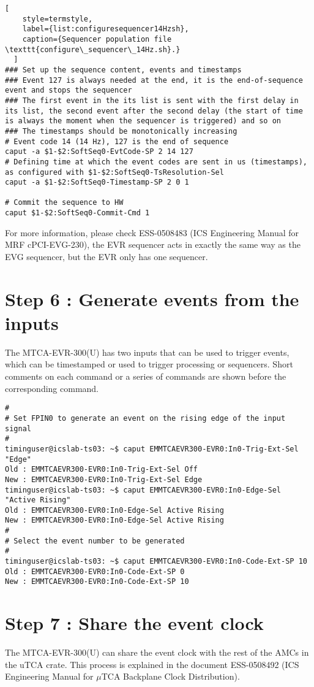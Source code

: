 \documentclass[11pt
  , a4paper
  , article
  , oneside
  , showtrims
]{memoir}
\begin{document}
{\begin{lstlisting}[
    style=termstyle,
    label={list:configuresequencer14Hzsh},
    caption={Sequencer population file \texttt{configure\_sequencer\_14Hz.sh}.}
  ]
### Set up the sequence content, events and timestamps
### Event 127 is always needed at the end, it is the end-of-sequence event and stops the sequencer
### The first event in the its list is sent with the first delay in its list, the second event after the second delay (the start of time is always the moment when the sequencer is triggered) and so on
### The timestamps should be monotonically increasing
# Event code 14 (14 Hz), 127 is the end of sequence
caput -a $1-$2:SoftSeq0-EvtCode-SP 2 14 127
# Defining time at which the event codes are sent in us (timestamps), as configured with $1-$2:SoftSeq0-TsResolution-Sel
caput -a $1-$2:SoftSeq0-Timestamp-SP 2 0 1

# Commit the sequence to HW
caput $1-$2:SoftSeq0-Commit-Cmd 1
\end{lstlisting}
For more information, please check ESS-0508483 (ICS Engineering Manual for MRF cPCI-EVG-230), the EVR sequencer acts in exactly the same way as the EVG sequencer, but the EVR only has one sequencer.


\section{Step 6 : Generate events from the inputs}
The MTCA-EVR-300(U) has two inputs that can be used to trigger events, which can be timestamped or used to trigger processing or sequencers. Short comments on each command or a series of commands are shown before the corresponding command.
\begin{lstlisting}[style=termstyle]
#
# Set FPIN0 to generate an event on the rising edge of the input signal
#
timinguser@icslab-ts03: ~$ caput EMMTCAEVR300-EVR0:In0-Trig-Ext-Sel "Edge"
Old : EMMTCAEVR300-EVR0:In0-Trig-Ext-Sel Off
New : EMMTCAEVR300-EVR0:In0-Trig-Ext-Sel Edge
timinguser@icslab-ts03: ~$ caput EMMTCAEVR300-EVR0:In0-Edge-Sel "Active Rising"
Old : EMMTCAEVR300-EVR0:In0-Edge-Sel Active Rising
New : EMMTCAEVR300-EVR0:In0-Edge-Sel Active Rising
#
# Select the event number to be generated
#
timinguser@icslab-ts03: ~$ caput EMMTCAEVR300-EVR0:In0-Code-Ext-SP 10
Old : EMMTCAEVR300-EVR0:In0-Code-Ext-SP 0
New : EMMTCAEVR300-EVR0:In0-Code-Ext-SP 10
\end{lstlisting}


\section{Step 7 : Share the event clock}
The MTCA-EVR-300(U) can share the event clock with the rest of the AMCs in the uTCA crate. This process is explained in the document ESS-0508492 (ICS Engineering Manual for $\mu$TCA Backplane Clock Distribution).



}
\end{document}
